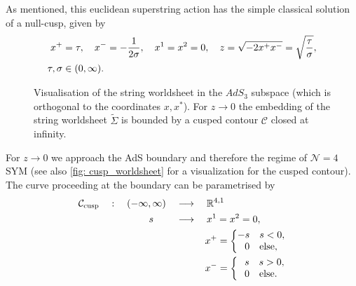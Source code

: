 %
%
As mentioned, this euclidean superstring action has the simple classical solution of a null-cusp, given by
%
%
\begin{align}
x^{+}&=\tau, \quad x^{-}=-\frac{1}{2\sigma}, \quad x^{1}=x^{2}=0, \quad z=\sqrt{-2x^{+}x^{-}}=\sqrt{\frac{\tau}{\sigma}},\label{eq: null_cusp} \\
\tau,\sigma &\in (0,\infty). \notag
\end{align}
%
%
\begin{figure}
\begin{center}
\caption{Visualisation of the string worldsheet in the $AdS_{3}$ subspace (which is orthogonal to the coordinates $x,x^{*}$). For $z\to 0$ the embedding of the string worldsheet $\widetilde{\Sigma}$ is bounded by a cusped contour $\mathcal{C}$ closed at infinity.\label{fig: cusp_worldsheet}}
\end{center}
\end{figure}
%
%
For $z\to 0$ we approach the AdS boundary and therefore the regime of $\mathcal{N}=4$ SYM (see also \autoref{fig: cusp_worldsheet} for a visualization for the cusped contour). The curve proceeding at the boundary can be parametrised by
%
%
\begin{align}
\mathcal{C}_{\rm cusp}\quad :\quad (-\infty,\infty) \quad &\longrightarrow \quad \mathbb{R}^{4,1} \notag \\
%
s\qquad \; &\longrightarrow  \quad x^{1}=x^{2}=0, \\
&\qquad \quad x^{+}=\left\lbrace 
\begin{matrix}
-s\quad s<0, \\ 
0\quad {\rm else,}
\end{matrix} \right. \notag \\
&\qquad \quad x^{-}=\left\lbrace 
\begin{matrix}
\;\;\, s\quad s>0, \\ 
0\quad {\rm else.}
\end{matrix} \right. \notag
\end{align}
